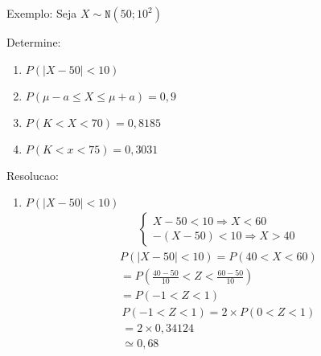 \documentclass[11pt,a4paper]{book}
\begin{document}
\begin{description}
\begin{description}
\begin{enumerate}[label=(\alph*)]
      \end{enumerate}
    \item {Exemplo:} Seja $X \sim \mathtt{N}(50; 10^2)$
      \begin{description}
        \item {Determine:}
          \begin{enumerate}[label=(\alph*)]
   \item $P(|X-50| <10)$
  \item $P( \mu-a \leq X \leq \mu +a )=0,9$
  \item $P(K< X <70)=0,8185$
  \item $P(K < x <75)= 0,3031$
          \end{enumerate}
        \item {Resolucao:}
\begin{enumerate}[label=(\alph*)]
   \item $P(|X-50| <10)$
     \begin{align*}
       \begin{cases}
        X-50<10 \Rightarrow X<60 \\
        -(X-50) <10 \Rightarrow X>40
       \end{cases}
     \end{align*}
     \begin{align*}
       P(|X-50| <10)  = P(40<X<60) \\
   = P(\frac{40-50}{10}< Z < \frac{60-50}{10}) \\
   = P(-1 < Z < 1)
 \end{align*} 
\begin{align*}
  P(-1 < Z <1)  = 2 \times P(0 < Z <1) \\
  = 2 \times 0,34124 \\
  \simeq 0,68
\end{align*}


\end{enumerate}
\end{description}
\end{description}
\end{description}
\end{document}
